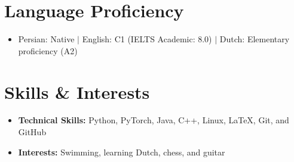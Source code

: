 \documentclass[letterpaper,11pt]{article}
\begin{document}
\section{Language Proficiency}
\begin{itemize}[leftmargin=0.15in,label={},itemsep=6pt,parsep=0pt,topsep=4pt]
  \small\item{Persian: Native $|$ English: C1 (IELTS Academic: 8.0) $|$ Dutch: Elementary proficiency (A2)}
\end{itemize}

\section{Skills \& Interests}
\begin{itemize}[leftmargin=0.15in,label={},itemsep=6pt,parsep=0pt,topsep=4pt]
  \small
  \item{\textbf{Technical Skills:} Python, PyTorch, Java, C++, Linux, LaTeX, Git, and GitHub}
  \item{\textbf{Interests:} Swimming, learning Dutch, chess, and guitar}
\end{itemize}
\end{document}
